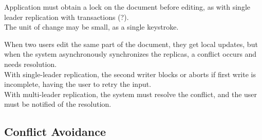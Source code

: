 Application must obtain a lock on the document before editing, as with single leader replication with transactions (?).\\
The unit of change may be small, as a single keystroke.\nl

When two users edit the same part of the document, they get local updates, but when the system asynchronously synchronizes the replicas, a conflict occurs and needs resolution.\\
With single-leader replication, the second writer blocks or aborts if first write is incomplete, having the user to retry the input.\\
With multi-leader replication, the system must resolve the conflict, and the user must be notified of the resolution.

\subsection{Conflict Avoidance}

